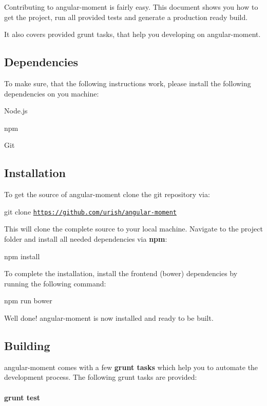 Contributing to {\ttfamily angular-\/moment} is fairly easy. This document shows you how to get the project, run all provided tests and generate a production ready build.

It also covers provided grunt tasks, that help you developing on {\ttfamily angular-\/moment}.

\subsection*{Dependencies}

To make sure, that the following instructions work, please install the following dependencies on you machine\+:


\begin{DoxyItemize}
\item Node.\+js
\item npm
\item Git
\end{DoxyItemize}

\subsection*{Installation}

To get the source of {\ttfamily angular-\/moment} clone the git repository via\+:

{\ttfamily git clone \href{https://github.com/urish/angular-moment}{\tt https\+://github.\+com/urish/angular-\/moment}}

This will clone the complete source to your local machine. Navigate to the project folder and install all needed dependencies via {\bfseries npm}\+:

{\ttfamily npm install}

To complete the installation, install the frontend (bower) dependencies by running the following command\+:

{\ttfamily npm run bower}

Well done! angular-\/moment is now installed and ready to be built.

\subsection*{Building}

{\ttfamily angular-\/moment} comes with a few {\bfseries grunt tasks} which help you to automate the development process. The following grunt tasks are provided\+:

\paragraph*{grunt test}

